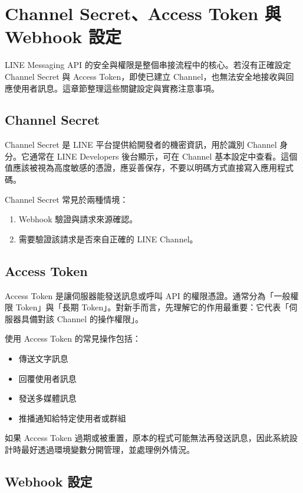 \section{Channel Secret、Access Token 與 Webhook 設定}

LINE Messaging API 的安全與權限是整個串接流程中的核心。若沒有正確設定 Channel Secret 與 Access Token，即使已建立 Channel，也無法安全地接收與回應使用者訊息。這章節整理這些關鍵設定與實務注意事項。

\subsection{Channel Secret}

Channel Secret 是 LINE 平台提供給開發者的機密資訊，用於識別 Channel 身分。它通常在 LINE Developers 後台顯示，可在 Channel 基本設定中查看。這個值應該被視為高度敏感的憑證，應妥善保存，不要以明碼方式直接寫入應用程式碼。

Channel Secret 常見於兩種情境：
\begin{enumerate}[leftmargin=2em]
    \item Webhook 驗證與請求來源確認。
    \item 需要驗證該請求是否來自正確的 LINE Channel。
\end{enumerate}

\subsection{Access Token}

Access Token 是讓伺服器能發送訊息或呼叫 API 的權限憑證。通常分為「一般權限 Token」與「長期 Token」。對新手而言，先理解它的作用最重要：它代表「伺服器具備對該 Channel 的操作權限」。

使用 Access Token 的常見操作包括：
\begin{itemize}[leftmargin=2em]
    \item 傳送文字訊息
    \item 回覆使用者訊息
    \item 發送多媒體訊息
    \item 推播通知給特定使用者或群組
\end{itemize}

如果 Access Token 過期或被重置，原本的程式可能無法再發送訊息，因此系統設計時最好透過環境變數分開管理，並處理例外情況。

\subsection{Webhook 設定}

